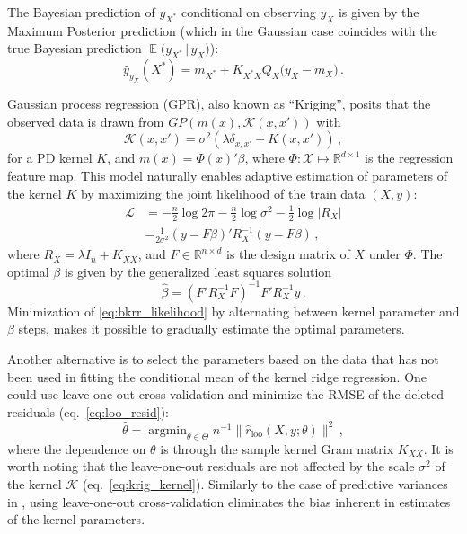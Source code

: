 \documentclass[a4paper,14pt]{extarticle}
\newcommand{\ex}{\mathop{\mathbb{E}}\nolimits}
\newcommand{\Kcal}{\mathcal{K}}
\newcommand{\Xcal}{\mathcal{X}}
\newcommand{\Real}{\mathbb{R}}
\newcommand{\Lcal}{\mathcal{L}}
\begin{document}
The Bayesian prediction of $y_{X^*}$ conditional on observing $y_X$ is given by
the Maximum Posterior prediction (which in the Gaussian case coincides with the
true Bayesian prediction $\ex\bigl(y_{X^*}\,|\, y_X\bigr)$):
\begin{equation*}
  \hat{y}_{y_X}(X^*) = m_{X^*} + K_{X^*X} Q_X \bigl(y_X - m_X\bigr) \,.
\end{equation*}

Gaussian process regression (GPR), also known as ``Kriging'', posits that the observed
data is drawn from $GP(m(x), \Kcal(x, x'))$ with
\begin{equation} \label{eq:krig_kernel}
  \Kcal(x,x') = \sigma^2( \lambda \delta_{x, x'} + K(x, x') ) \,,
\end{equation}
for a PD kernel $K$, and $m(x) = \Phi(x)'\beta$, where $\Phi: \Xcal\mapsto \Real^{d\times 1}$
is the regression feature map. This model naturally enables adaptive estimation of
parameters of the kernel $K$ by maximizing the joint likelihood of the train data
$(X, y)$:
\begin{align} \label{eq:bkrr_likelihood}
  \Lcal
    &= -\frac{n}{2} \log 2\pi
    - \frac{n}{2}\log \sigma^2
    - \frac{1}{2}\log \lvert R_X \rvert \nonumber\\
    &- \frac{1}{2\sigma^2} (y - F\beta)' R_X^{-1} (y - F\beta)
    \,,
\end{align}
where $R_X = \lambda I_n + K_{XX}$, and $F \in\Real^{n\times d}$ is the design matrix
of $X$ under $\Phi$. The optimal $\beta$ is given by the generalized least squares
solution
\begin{equation*}
  \hat{\beta} = (F'R_X^{-1}F)^{-1} F'R_X^{-1} y \,.
\end{equation*}
Minimization of \ref{eq:bkrr_likelihood} by alternating between kernel parameter
and $\beta$ steps, makes it possible to gradually estimate the optimal parameters.

Another alternative is to select the parameters based on the data that has not been
used in fitting the conditional mean of the kernel ridge regression. One could use
leave-one-out cross-validation and minimize the RMSE of the deleted residuals
(eq.~\ref{eq:loo_resid}):
\begin{equation}
  \hat{\theta}
    = \mathop{\text{argmin}}_{\theta \in\Theta}
      n^{-1} \| \hat{r}_{\text{loo}}(X, y; \theta) \|^2
    \,,
\end{equation}
where the dependence on $\theta$ is through the sample kernel Gram matrix $K_{XX}$.
It is worth noting that the leave-one-out residuals are not affected by the scale
$\sigma^2$ of the kernel $\Kcal$ (eq.~\ref{eq:krig_kernel}). Similarly to the case
of predictive variances in \cite{pcw20005a7}, using leave-one-out cross-validation
eliminates the bias inherent in estimates of the kernel parameters.
\end{document}
